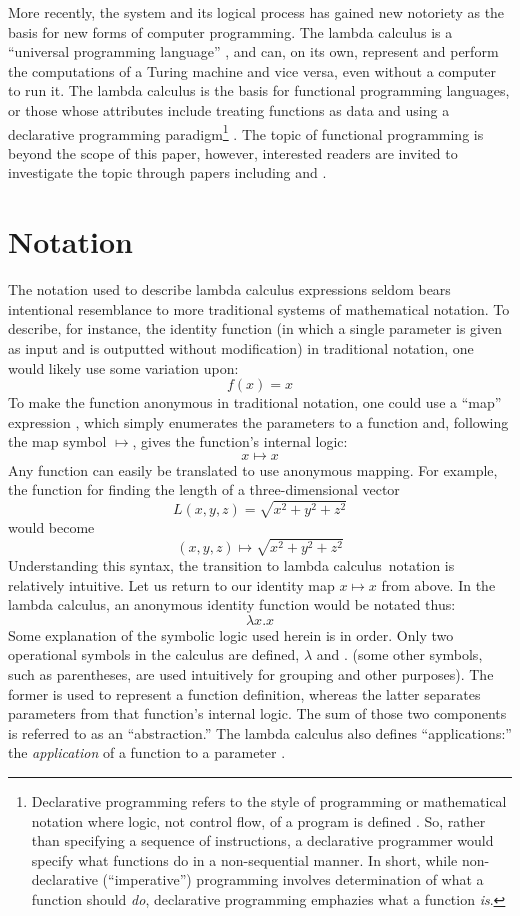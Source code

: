 \documentclass[twocolumn,titlepage,12pt]{article}
\begin{document}
More recently, the system and its logical process has gained new notoriety as the basis for new forms of computer programming. The lambda calculus is a ``universal programming language'' \cite{rojastutorial}, and can, on its own, represent and perform the computations of a Turing machine and vice versa, even without a computer to run it. The lambda calculus is the basis for functional programming languages, or those whose attributes include treating functions as data and using a declarative programming paradigm\footnote{Declarative programming refers to the style of programming or mathematical notation where logic, not control flow, of a program is defined \cite{declarativeprogadv}. So, rather than specifying a sequence of instructions, a declarative programmer would specify what functions do in a non-sequential manner. In short, while non-declarative (``imperative'') programming involves determination of what a function should \textit{do}, declarative programming emphazies what a function \textit{is}.} \cite{hudakevolution}. The topic of functional programming is beyond the scope of this paper, however, interested readers are invited to investigate the topic through papers including \cite{totalfp} and \cite{hudakevolution}.

\section{Notation}
The notation used to describe lambda calculus expressions seldom bears intentional resemblance to more traditional systems of mathematical notation. To describe, for instance, the identity function (in which a single parameter is given as input and is outputted without modification) in traditional notation, one would likely use some variation upon:
$$f(x)=x$$
To make the function anonymous in traditional notation, one could use a ``map'' expression \cite{intrographtheory}, which simply enumerates the parameters to a function and, following the map symbol $\mapsto$, gives the function's internal logic:
$$x\mapsto x$$
Any function can easily be translated to use anonymous mapping. For example, the function for finding the length of a three-dimensional vector
$$L(x,y,z)=\sqrt{x^2+y^2+z^2}$$
would become
$$(x,y,z) \mapsto \sqrt{x^2+y^2+z^2}$$
Understanding this syntax, the transition to lambda calculus notation is relatively intuitive. Let us return to our identity map $x\mapsto x$ from above. In the lambda calculus, an anonymous identity function would be notated thus:
$$\lambda x.x$$
Some explanation of the symbolic logic used herein is in order. Only two operational symbols in the calculus are defined, $\lambda$ and $.$ (some other symbols, such as parentheses, are used intuitively for grouping and other purposes). The former is used to represent a function definition, whereas the latter separates parameters from that function's internal logic. The sum of those two components is referred to as an ``abstraction.'' The lambda calculus also defines ``applications:'' the \textit{application} of a function to a parameter \cite{horowitz}.
\end{document}
